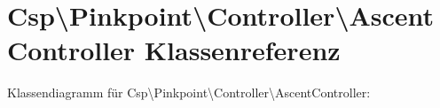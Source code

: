 \hypertarget{classCsp_1_1Pinkpoint_1_1Controller_1_1AscentController}{}\section{Csp\textbackslash{}Pinkpoint\textbackslash{}Controller\textbackslash{}Ascent\+Controller Klassenreferenz}
\label{classCsp_1_1Pinkpoint_1_1Controller_1_1AscentController}


Klassendiagramm für Csp\textbackslash{}Pinkpoint\textbackslash{}Controller\textbackslash{}Ascent\+Controller\+:
